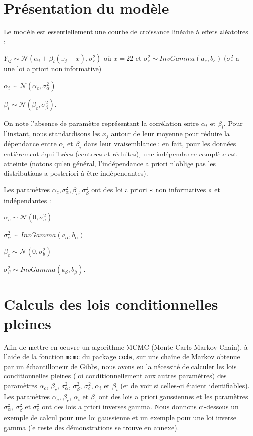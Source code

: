 \documentclass[
]{article}
\begin{document}
\hypertarget{pruxe9sentation-du-moduxe8le}{%
\section{Présentation du modèle}\label{pruxe9sentation-du-moduxe8le}}

Le modèle est essentiellement une courbe de croissance linéaire à effets
aléatoires :

\(Y_{ij} \sim \mathcal N(\alpha_i + \beta_i(x_j - \bar x), \sigma_c ^2)\)
où \(\bar x = 22\) et \(\sigma_c ^2 \sim InvGamma(a_c,b_c)\)
(\(\sigma_c ^2\) a une loi a priori non informative)

\(\alpha_i \sim \mathcal N(\alpha_c,\sigma_{\alpha}^2)\)

\(\beta_i \sim \mathcal N(\beta_c,\sigma_{\beta}^2)\).

On note l'absence de paramètre représentant la corrélation entre
\(\alpha_i\) et \(\beta_i\). Pour l'instant, nous standardisons les
\(x_j\) autour de leur moyenne pour réduire la dépendance entre
\(\alpha_i\) et \(\beta_i\) dans leur vraisemblance : en fait, pour les
données entièrement équilibrées (centrées et réduites), une indépendance
complète est atteinte (notons qu'en général, l'indépendance a priori
n'oblige pas les distributions a posteriori à être indépendantes).

Les paramètres
\(\alpha_c, \sigma_{\alpha}^2, \beta_c, \sigma_{\beta}^2\) ont des loi a
priori « non informatives » et indépendantes :

\(\alpha_c \sim\mathcal N(0,\sigma_a^2)\)

\(\sigma_{\alpha}^2 \sim InvGamma(a_{\alpha},b_{\alpha})\)

\(\beta_c \sim \mathcal N(0,\sigma_b^2)\)

\(\sigma_{\beta}^2 \sim InvGamma(a_{\beta},b_{\beta})\).

\hypertarget{calculs-des-lois-conditionnelles-pleines}{%
\section{Calculs des lois conditionnelles
pleines}\label{calculs-des-lois-conditionnelles-pleines}}

Afin de mettre en oeuvre un algorithme MCMC (Monte Carlo Markov Chain),
à l'aide de la fonction \texttt{mcmc} du package \texttt{coda}, sur une
chaîne de Markov obtenue par un échantilloneur de Gibbs, nous avons eu
la nécessité de calculer les lois conditionnelles pleines (loi
conditionnellement aux autres paramètres) des paramètres \(\alpha_c\),
\(\beta_c\), \(\sigma_{\alpha}^2\), \(\sigma_{\beta}^2\),
\(\sigma_c ^2\), \(\alpha_i\) et \(\beta_i\) (et de voir si celles-ci
étaient identifiables). Les paramètres \(\alpha_c\), \(\beta_c\),
\(\alpha_i\) et \(\beta_i\) ont des lois a priori gaussiennes et les
paramètres \(\sigma_{\alpha}^2\), \(\sigma_{\beta}^2\) et
\(\sigma_c ^2\) ont des lois a priori inverses gamma. Nous donnons
ci-dessous un exemple de calcul pour une loi gaussienne et un exemple
pour une loi inverse gamma (le reste des démonstrations se trouve en
annexe).
\end{document}
